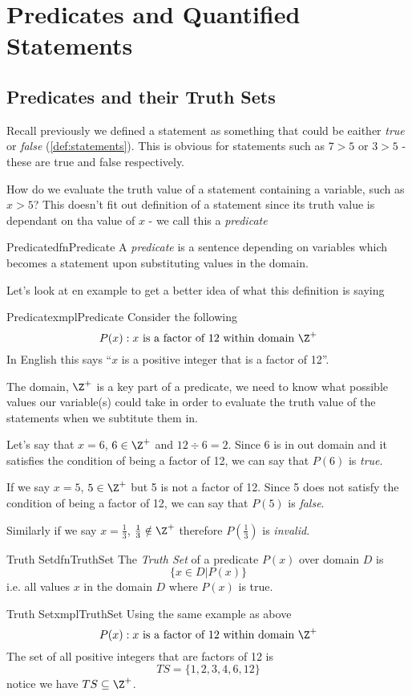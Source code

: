 \chapter{Predicates and Quantified Statements}

\section{Predicates and their Truth Sets}
Recall previously we defined a statement as something that could be eaither \emph{true} or \emph{false} (\cref{def:statements}). This is obvious for statements such as $7 > 5$ or $3 > 5$ - these are true and false respectively.

How do we evaluate the truth value of a statement containing a variable, such as $x > 5$? This doesn't fit out definition of a statement since its truth value is dependant on tha value of $x$ - we call this a \emph{predicate}

\begin{dfn}[label={def:predicate}]{Predicate}{dfnPredicate}
    A \emph{predicate} is a sentence depending on variables which becomes a statement upon substituting values in the domain.
\end{dfn}

Let's look at en example to get a better idea of what this definition is saying

\begin{exmpl}[label={exmpl:predicate}]{Predicate}{xmplPredicate}
    Consider the following
    $$P(x): x \text{ is a factor of } 12 \text{ within domain } \Z^+ $$
    In English this says ``$x$ is a positive integer that is a factor of 12''.

    The domain, $\Z^+$ is a key part of a predicate, we need to know what possible values our variable(s) could take in order to evaluate the truth value of the statements when we subtitute them in.

    Let's say that $x = 6$, $6 \in \Z^+$ and $12 \div 6 = 2$. Since $6$ is in out domain and it satisfies the condition of being a factor of 12, we can say that $P(6)$ is \emph{true}.

    If we say $x = 5$, $5 \in \Z^+$ but 5 is not a factor of 12. Since 5 does not satisfy the condition of being a factor of 12, we can say that $P(5)$ is \emph{false}.

    Similarly if we say $x = \frac{1}{3}$, $\frac{1}{3} \notin \Z^+$ therefore $P(\frac{1}{3})$ is \emph{invalid}.
\end{exmpl}
\newpage
\begin{dfn}[label={def:truthSet}]{Truth Set}{dfnTruthSet}
    The \emph{Truth Set} of a predicate $P(x)$ over domain $D$ is
    $$\{x \in D | P(x)\}$$
    i.e. all values $x$ in the domain $D$ where $P(x)$ is true.
\end{dfn}
\begin{exmpl}[label={exmpl:truthSet}]{Truth Set}{xmplTruthSet}
    Using the same example as above
    $$P(x): x \text{ is a factor of } 12 \text{ within domain } \Z^+ $$
    The set of all positive integers that are factors of 12 is
    $$TS=\{1, 2,3,4,6,12 \}$$
    notice we have $TS \subseteq \Z^+$.
\end{exmpl}

